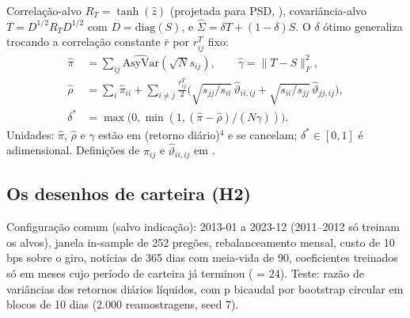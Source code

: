 \documentclass[11pt,a4paper]{article}
\newcommand{\Sig}{\hat\Sigma}
\begin{document}
Correlação-alvo $R_T=\tanh(\hat z)$ (projetada para PSD, \citealt{higham2002}), covariância-alvo
$T=D^{1/2}R_TD^{1/2}$ com $D=\mathrm{diag}(S)$, e $\Sig=\delta T+(1-\delta)S$. O $\delta$ ótimo
generaliza \citet{ledoit2004honey} trocando a correlação constante $\bar r$ por $r^T_{ij}$ fixo:
\begin{align*}
\hat\pi &= \textstyle\sum_{ij}\widehat{\mathrm{AsyVar}}(\sqrt N s_{ij}),\qquad
\hat\gamma = \|T-S\|_F^2,\\
\hat\rho &= \textstyle\sum_i\hat\pi_{ii}+\sum_{i\neq j}\frac{r^T_{ij}}{2}\Big(\sqrt{s_{jj}/s_{ii}}\,\hat\vartheta_{ii,ij}+\sqrt{s_{ii}/s_{jj}}\,\hat\vartheta_{jj,ij}\Big),\\
\delta^* &= \max\!\big(0,\min(1,(\hat\pi-\hat\rho)/(N\hat\gamma))\big).
\end{align*}
Unidades: $\hat\pi$, $\hat\rho$ e $\hat\gamma$ estão em (retorno diário)$^4$ e se cancelam; $\delta^*\in[0,1]$ é
adimensional. Definições de $\hat\pi_{ij}$ e $\hat\vartheta_{ii,ij}$ em .

\subsection{Os desenhos de carteira (H2)}

Configuração comum (salvo indicação): 2013-01 a 2023-12 (2011--2012 só treinam os alvos), janela
in-sample de 252 pregões, rebalanceamento mensal, custo de 10 bps sobre o giro, notícias de 365 dias
com meia-vida de 90, coeficientes treinados só em meses cujo período de carteira já terminou
( = 24). Teste: razão de variâncias dos retornos diários líquidos, com p bicaudal por
bootstrap circular em blocos de 10 dias (2.000 reamostragens, seed 7).
\end{document}
